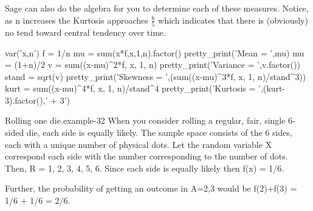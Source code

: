 \documentclass[10pt,]{book}
\numberwithin{equation}{section}
\begin{document}
%
\par
\hypertarget{p-804}{}%
Sage can also do the algebra for you to determine each of these measures. Notice, as n increases the Kurtosis approaches \(\frac{6}{5}\) which indicates that there is (obviously) no tend toward central tendency over time.%
\par
\hypertarget{p-805}{}%
\leavevmode%
\begin{sageinput}
var('x,n')
f = 1/n
mu = sum(x*f,x,1,n).factor()
pretty_print('Mean = ',mu)
mu = (1+n)/2
v = sum((x-mu)^2*f, x, 1, n)
pretty_print('Variance = ',v.factor())
stand = sqrt(v)
pretty_print('Skewness =  ',(sum((x-mu)^3*f, x, 1, n)/stand^3))
kurt = sum((x-mu)^4*f, x, 1, n)/stand^4
pretty_print('Kurtosis = ',(kurt-3).factor(),' + 3')
\end{sageinput}
%
\par
\hypertarget{p-806}{}%
\begin{example}{Rolling one die.}{example-32}%
\hypertarget{p-807}{}%
When you consider rolling a regular, fair, single 6-sided die, each side is equally likely. The sample space consists of the 6 sides, each with a unique number of physical dots. Let the random variable X correspond each side with the number corresponding to the number of dots. Then, R = {1, 2, 3, 4, 5, 6}.  Since each side is equally likely then f(x) = 1/6.%
\par
\hypertarget{p-808}{}%
Further, the probability of getting an outcome in A={2,3} would be f(2)+f(3) = 1/6 + 1/6 = 2/6.%
\end{example}
%
%
%
\typeout{************************************************}
\typeout{************************************************}
%
\end{document}
